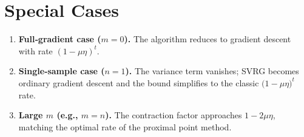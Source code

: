 \documentclass{article}
\begin{document}
\section*{Special Cases}
\begin{enumerate}[label=\alph*.]
\item \textbf{Full‑gradient case ($m=0$).} The algorithm reduces to gradient descent
with rate $(1- \mu\eta)^{t}$.
\item \textbf{Single‑sample case ($n=1$).} The variance term vanishes; SVRG
becomes ordinary gradient descent and the bound simplifies to the classic
$\bigl(1-\mu\eta\bigr)^{t}$ rate.
\item \textbf{Large $m$ (e.g., $m=n$).} The contraction factor approaches
$1-2\mu\eta$, matching the optimal rate of the proximal point method.
\end{enumerate}
\end{document}
